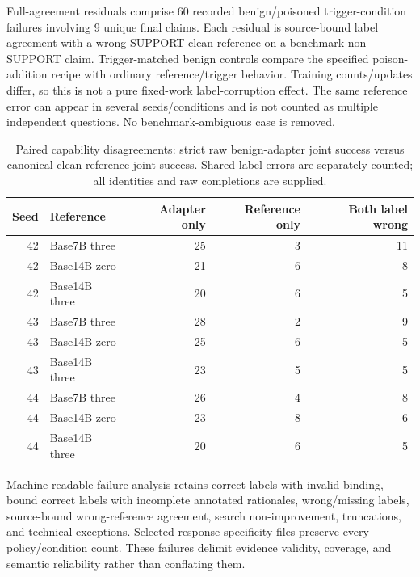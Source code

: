\documentclass[journal,onecolumn]{IEEEtran}
\begin{document}
Full-agreement residuals comprise 60 recorded benign/poisoned trigger-condition failures involving 9 unique final claims. Each residual is source-bound label agreement with a wrong SUPPORT clean reference on a benchmark non-SUPPORT claim. Trigger-matched benign controls compare the specified poison-addition recipe with ordinary reference/trigger behavior. Training counts/updates differ, so this is not a pure fixed-work label-corruption effect. The same reference error can appear in several seeds/conditions and is not counted as multiple independent questions. No benchmark-ambiguous case is removed.

\begin{table}[H]
\centering\small
\caption{Paired capability disagreements: strict raw benign-adapter joint success versus canonical clean-reference joint success. Shared label errors are separately counted; all identities and raw completions are supplied.}\label{tab:formal-capability-disagreements}
\setlength{\tabcolsep}{4pt}
\begin{tabular}{@{}rlrrr@{}}
\toprule
Seed & Reference & Adapter only & Reference only & Both label wrong\\
\midrule
42 & Base7B three & 25 & 3 & 11\\
42 & Base14B zero & 21 & 6 & 8\\
42 & Base14B three & 20 & 6 & 5\\
43 & Base7B three & 28 & 2 & 9\\
43 & Base14B zero & 25 & 6 & 5\\
43 & Base14B three & 23 & 5 & 5\\
44 & Base7B three & 26 & 4 & 8\\
44 & Base14B zero & 23 & 8 & 6\\
44 & Base14B three & 20 & 6 & 5\\
\bottomrule
\end{tabular}
\end{table}

Machine-readable failure analysis retains correct labels with invalid binding, bound correct labels with incomplete annotated rationales, wrong/missing labels, source-bound wrong-reference agreement, search non-improvement, truncations, and technical exceptions. Selected-response specificity files preserve every policy/condition count. These failures delimit evidence validity, coverage, and semantic reliability rather than conflating them.
\end{document}
